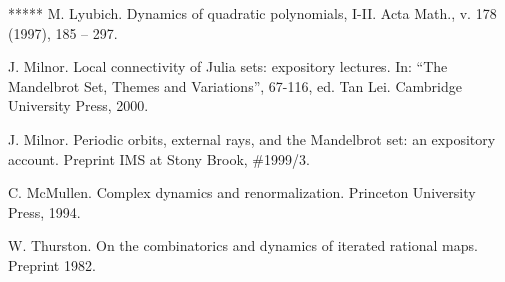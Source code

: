 \begin{thebibliography}{*****}
 M. Lyubich. Dynamics of quadratic polynomials, I-II. 
   Acta Math., v. 178 (1997), 185 -- 297.



 J. Milnor.
     Local connectivity of Julia sets: expository lectures.
     In: ``The Mandelbrot Set, Themes and Variations'',  67-116, ed. Tan Lei.  
     Cambridge University Press, 2000.

 J. Milnor.
  Periodic orbits, external rays, and the Mandelbrot set: an expository account.
  Preprint IMS at Stony Brook, \#1999/3.

 C. McMullen. Complex dynamics and renormalization.
   Princeton University Press, 1994. 

 W. Thurston. 
  On the combinatorics and dynamics of iterated rational maps.
  Preprint 1982.

\end{thebibliography}
